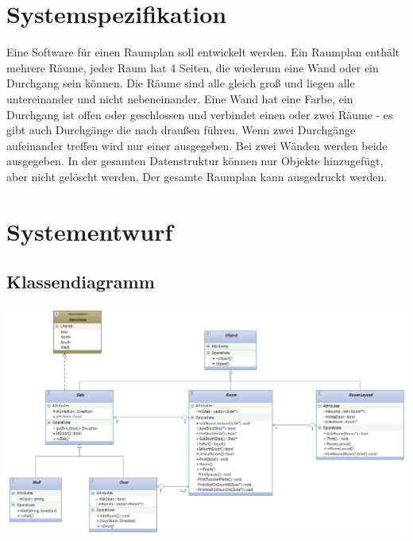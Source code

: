 \documentclass[12pt,a4paper]{article}
\begin{document}
\section{Systemspezifikation}
Eine Software für einen Raumplan soll entwickelt werden. Ein Raumplan enthält mehrere Räume, jeder Raum hat 4 Seiten, die wiederum eine Wand oder ein Durchgang sein können. Die Räume sind alle gleich groß und liegen alle untereinander und nicht nebeneinander. Eine Wand hat eine Farbe, ein Durchgang ist offen oder geschlossen und verbindet einen oder zwei Räume - es gibt auch Durchgänge die nach draußen führen. Wenn zwei Durchgänge aufeinander treffen wird nur einer ausgegeben. Bei zwei Wänden werden beide ausgegeben. In der gesamten Datenstruktur können nur Objekte hinzugefügt, aber nicht gelöscht werden. Der gesamte Raumplan kann ausgedruckt werden. \\


\newpage
\section {Systementwurf}

\subsection {Klassendiagramm}

\includegraphics[angle=90,scale=0.7] {../Klassendiagramm.png}
\end{document}
